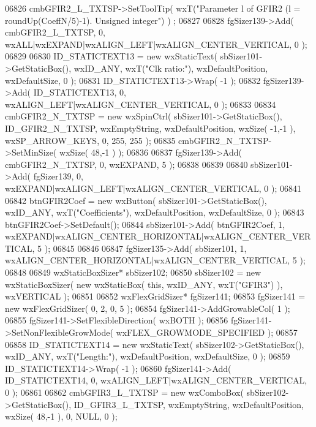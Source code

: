 \begin{DoxyCode}
06826     cmbGFIR2_L_TXTSP->SetToolTip( wxT(\textcolor{stringliteral}{"Parameter l of GFIR2 (l = roundUp(CoeffN/5)-1). Unsigned integer"}) )
      ;
06827     
06828     fgSizer139->Add( cmbGFIR2_L_TXTSP, 0, wxALL|wxEXPAND|wxALIGN\_LEFT|wxALIGN\_CENTER\_VERTICAL, 0 );
06829     
06830     ID_STATICTEXT13 = \textcolor{keyword}{new} wxStaticText( sbSizer101->GetStaticBox(), wxID\_ANY, wxT(\textcolor{stringliteral}{"Clk ratio:"}), 
      wxDefaultPosition, wxDefaultSize, 0 );
06831     ID_STATICTEXT13->Wrap( -1 );
06832     fgSizer139->Add( ID_STATICTEXT13, 0, wxALIGN\_LEFT|wxALIGN\_CENTER\_VERTICAL, 0 );
06833     
06834     cmbGFIR2_N_TXTSP = \textcolor{keyword}{new} wxSpinCtrl( sbSizer101->GetStaticBox(), 
      ID_GFIR2_N_TXTSP, wxEmptyString, wxDefaultPosition, wxSize( -1,-1 ), wxSP\_ARROW\_KEYS, 0, 255, 255 );
06835     cmbGFIR2_N_TXTSP->SetMinSize( wxSize( 48,-1 ) );
06836     
06837     fgSizer139->Add( cmbGFIR2_N_TXTSP, 0, wxEXPAND, 5 );
06838     
06839     
06840     sbSizer101->Add( fgSizer139, 0, wxEXPAND|wxALIGN\_LEFT|wxALIGN\_CENTER\_VERTICAL, 0 );
06841     
06842     btnGFIR2Coef = \textcolor{keyword}{new} wxButton( sbSizer101->GetStaticBox(), wxID\_ANY, wxT(\textcolor{stringliteral}{"Coefficients"}), 
      wxDefaultPosition, wxDefaultSize, 0 );
06843     btnGFIR2Coef->SetDefault(); 
06844     sbSizer101->Add( btnGFIR2Coef, 1, wxEXPAND|wxALIGN\_CENTER\_HORIZONTAL|wxALIGN\_CENTER\_VERTICAL, 5 );
06845     
06846     
06847     fgSizer135->Add( sbSizer101, 1, wxALIGN\_CENTER\_HORIZONTAL|wxALIGN\_CENTER\_VERTICAL, 5 );
06848     
06849     wxStaticBoxSizer* sbSizer102;
06850     sbSizer102 = \textcolor{keyword}{new} wxStaticBoxSizer( \textcolor{keyword}{new} wxStaticBox( \textcolor{keyword}{this}, wxID\_ANY, wxT(\textcolor{stringliteral}{"GFIR3"}) ), wxVERTICAL );
06851     
06852     wxFlexGridSizer* fgSizer141;
06853     fgSizer141 = \textcolor{keyword}{new} wxFlexGridSizer( 0, 2, 0, 5 );
06854     fgSizer141->AddGrowableCol( 1 );
06855     fgSizer141->SetFlexibleDirection( wxBOTH );
06856     fgSizer141->SetNonFlexibleGrowMode( wxFLEX\_GROWMODE\_SPECIFIED );
06857     
06858     ID_STATICTEXT14 = \textcolor{keyword}{new} wxStaticText( sbSizer102->GetStaticBox(), wxID\_ANY, wxT(\textcolor{stringliteral}{"Length:"}), 
      wxDefaultPosition, wxDefaultSize, 0 );
06859     ID_STATICTEXT14->Wrap( -1 );
06860     fgSizer141->Add( ID_STATICTEXT14, 0, wxALIGN\_LEFT|wxALIGN\_CENTER\_VERTICAL, 0 );
06861     
06862     cmbGFIR3_L_TXTSP = \textcolor{keyword}{new} wxComboBox( sbSizer102->GetStaticBox(), 
      ID_GFIR3_L_TXTSP, wxEmptyString, wxDefaultPosition, wxSize( 48,-1 ), 0, NULL, 0 ); 

\end{DoxyCode}
